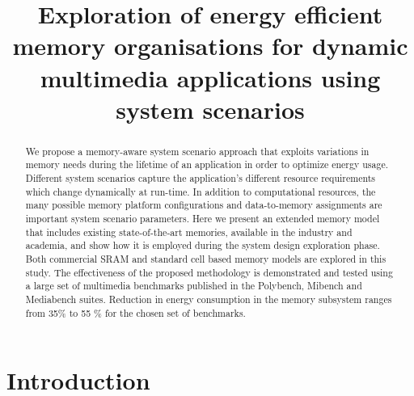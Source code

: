 \documentclass[a4paper,conference]{IEEEtran}
\begin{document}
\title{Exploration of energy efficient memory organisations for dynamic multimedia applications using system scenarios}

\author{
}

\maketitle

\begin{abstract}
We propose a memory-aware system scenario approach that exploits variations in memory needs during the lifetime of an application in order to optimize energy usage. Different system scenarios capture the application's different resource requirements which change dynamically at run-time. In addition to computational resources, the many possible memory platform configurations and data-to-memory assignments are important system scenario parameters. Here we present an extended memory model that includes existing state-of-the-art memories, available in the industry and academia, and show how it is employed during the system design exploration phase. Both commercial SRAM and standard cell based memory models are explored in this study. The effectiveness of the proposed methodology is demonstrated and tested using a large set of multimedia benchmarks published in the Polybench, Mibench and Mediabench suites. Reduction in energy consumption in the memory subsystem ranges from 35\% to 55 \% for the chosen set of benchmarks.
\end{abstract}
\IEEEpeerreviewmaketitle


\section{Introduction}
\label{sec:introduction}
\end{document}
